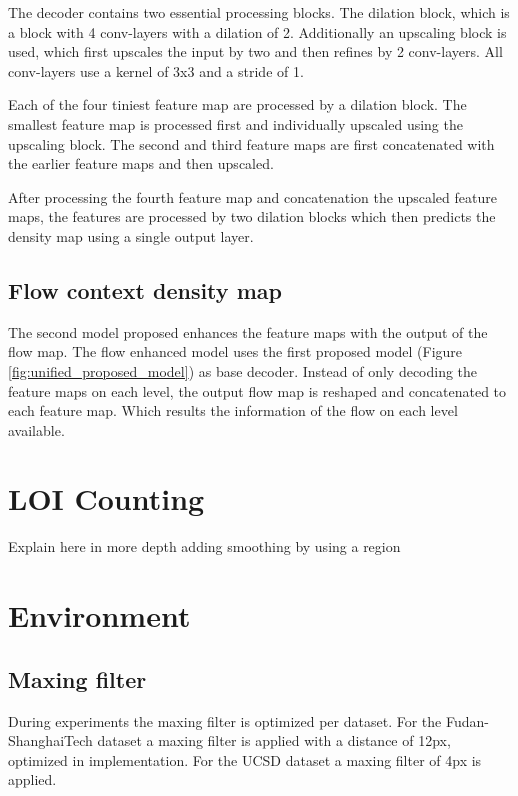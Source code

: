 The decoder contains two essential processing blocks. The dilation block, which is a block with 4 conv-layers with a dilation of 2. Additionally an upscaling block is used, which first upscales the input by two and then refines by 2 conv-layers. All conv-layers use a kernel of 3x3 and a stride of 1.

Each of the four tiniest feature map are processed by a dilation block. The smallest feature map is processed first and individually upscaled using the upscaling block. The second and third feature maps are first concatenated with the earlier feature maps and then upscaled.

After processing the fourth feature map and concatenation the upscaled feature maps, the features are processed by two dilation blocks which then predicts the density map using a single output layer.



\subsection{Flow context density map}
The second model proposed enhances the feature maps with the output of the flow map. The flow enhanced model uses the first proposed model (Figure \ref{fig:unified_proposed_model}) as base decoder. Instead of only decoding the feature maps on each level, the output flow map is reshaped and concatenated to each feature map. Which results the information of the flow on each level available.

\section{LOI Counting}
Explain here in more depth adding smoothing by using a region

\section{Environment}

\subsection{Maxing filter}
During experiments the maxing filter is optimized per dataset. For the Fudan-ShanghaiTech dataset a maxing filter is applied with a distance of 12px, optimized in implementation. For the UCSD dataset a maxing filter of 4px is applied.

